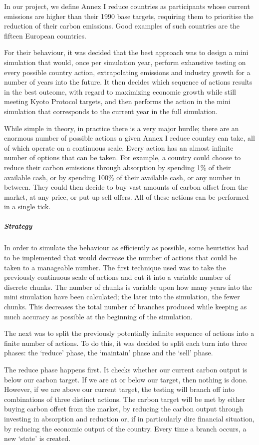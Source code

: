 In our project, we define Annex I reduce countries as participants whose current emissions are higher than their 1990 base targets, requiring them to prioritise the reduction of their carbon emissions. Good examples of such countries are the fifteen European countries.

For their behaviour, it was decided that the best approach was to design a mini simulation that would, once per simulation year, perform exhaustive testing on every possible country action, extrapolating emissions and industry growth for a number of years into the future. It then decides which sequence of actions results in the best outcome, with regard to maximizing economic growth while still meeting Kyoto Protocol targets, and then performs the action in the mini simulation that corresponds to the current year in the full simulation.

While simple in theory, in practice there is a very major hurdle; there are an enormous number of possible actions a given Annex I reduce country can take, all of which operate on a continuous scale. Every action has an almost infinite number of options that can be taken. For example, a country could choose to reduce their carbon emissions through absorption by spending 1\% of their available cash, or by spending 100\% of their available cash, or any number in between. They could then decide to buy vast amounts of carbon offset from the market, at any price, or put up sell offers. All of these actions can be performed in a single tick.

\subparagraph{Strategy}

In order to simulate the behaviour as efficiently as possible, some heuristics had to be implemented that would decrease the number of actions that could be taken to a manageable number. The first technique used was to take the previously continuous scale of actions and cut it into a variable number of discrete chunks. The number of chunks is variable upon how many years into the mini simulation have been calculated; the later into the simulation, the fewer chunks. This decreases the total number of branches produced while keeping as much accuracy as possible at the beginning of the simulation.

The next was to split the previously potentially infinite sequence of actions into a finite number of actions. To do this, it was decided to split each turn into three phases: the `reduce' phase, the `maintain' phase and the `sell' phase.

The reduce phase happens first. It checks whether our current carbon output is below our carbon target. If we are at or below our target, then nothing is done. However, if we are above our current target, the testing will branch off into combinations of three distinct actions. The carbon target will be met by either buying carbon offset from the market, by reducing the carbon output through investing in absorption and reduction or, if in particularly dire financial situation, by reducing the economic output of the country. Every time a branch occurs, a new `state' is created.

